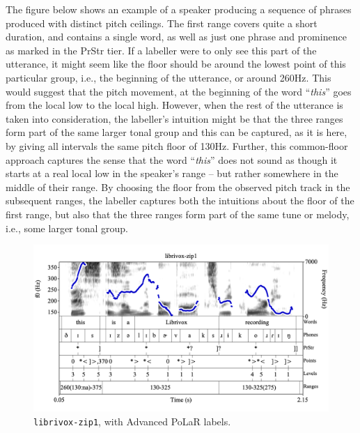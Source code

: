\documentclass[11pt, twoside]{memoir}
\def\langtext#1{\textit{#1}}
\begin{document}
The figure below shows an example of a speaker producing a sequence of phrases produced with distinct pitch ceilings. The first range covers quite a short duration, and contains a single word, as well as just one phrase and prominence as marked in the PrStr tier. If a labeller were to only see this part of the utterance, it might seem like the floor should be around the lowest point of this particular group, i.e., the beginning of the utterance, or around 260Hz. This would suggest that the pitch movement, at the beginning of the word “\langtext{this}” goes from the local low to the local high. However, when the rest of the utterance is taken into consideration, the labeller’s  intuition might be that the three ranges form part of the same larger tonal group and this can be captured, as it is here, by giving all intervals the same pitch floor of 130Hz. Further, this common-floor approach captures the sense that the word “\langtext{this}” does not sound as though it starts at a real local low in the speaker’s range – but rather somewhere in the middle of their range. By choosing the floor from the observed pitch track in the subsequent ranges, the labeller captures both the intuitions about the floor of the first range, but also that the three ranges form part of the same tune or melody, i.e., some larger tonal group.

\begin{figure}[H]
\centering
%
\includegraphics[width=.875\linewidth]{Ranges-librivox-zip1-adv.png}
%
\caption{\texttt{librivox-zip1}, with Advanced PoLaR labels.%
\label{fig:librivox-zip1 Ranges Adv}%
}
\end{figure}
\end{document}
